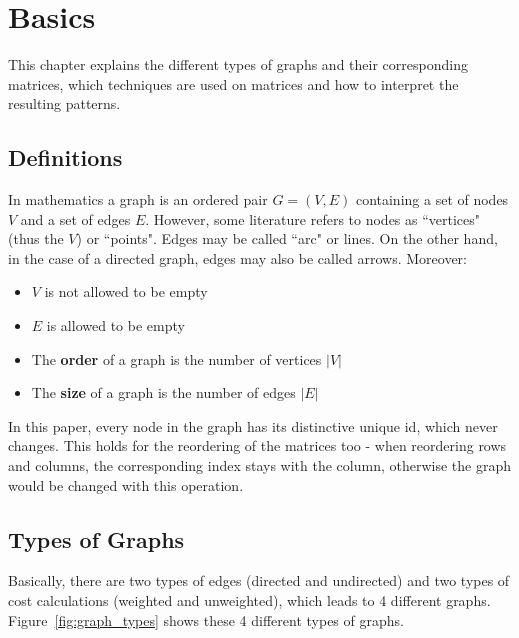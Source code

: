 %
%
% 
% 
% 


\chapter{Basics}\label{chap:Basics}


This chapter explains the different types of graphs and their corresponding matrices, which techniques are used on matrices and how to interpret the resulting patterns.

\section{Definitions}
In mathematics a graph is an ordered pair $G = (V, E)$ containing a set of nodes $V$ and a set of edges $E$. However, some literature refers to nodes as ``vertices" (thus the $V$) or ``points".
Edges may be called ``arc" or lines. 
On the other hand, in the case of a directed graph, edges may also be called arrows. Moreover: \begin{itemize}
	\item $V$ is not allowed to be empty
	\item $E$ is allowed to be empty
	\item The \textbf{order} of a graph is the number of vertices $|V|$
	\item The \textbf{size} of a graph is the number of edges $|E|$
\end{itemize}

In this paper, every node in the graph has its distinctive unique id, which never changes. This holds for the reordering of the matrices too - when reordering rows and columns, the corresponding index stays with the column, otherwise the graph would be changed with this operation.


\section{Types of Graphs}

Basically, there are two types of edges (directed and undirected) and two types of cost calculations (weighted and unweighted), which leads to 4 different graphs. Figure~\ref{fig:graph_types} shows these 4 different types of graphs. 


